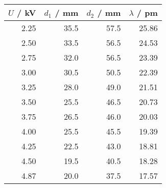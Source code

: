 \begin{tabular}{r|rrr}
$U$ / kV & $d_1$ / mm & $d_2$ / mm  & $\lambda$ / pm \\
\hline
2.25 & 35.5 & 57.5 & 25.86\\
2.50 & 33.5 & 56.5 & 24.53\\
2.75 & 32.0 & 56.5 & 23.39\\
3.00 & 30.5 & 50.5 & 22.39\\
3.25 & 28.0 & 49.0 & 21.51\\
3.50 & 25.5 & 46.5 & 20.73\\
3.75 & 26.5 & 46.0 & 20.03\\
4.00 & 25.5 & 45.5 & 19.39\\
4.25 & 22.5 & 43.0 & 18.81\\
4.50 & 19.5 & 40.5 & 18.28\\
4.87 & 20.0 & 37.5 & 17.57\\
\end{tabular}

